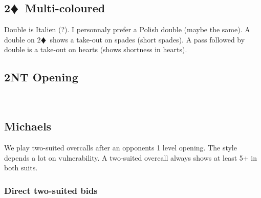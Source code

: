 \documentclass[a4paper]{article}
\newcommand{\BD}{\textcolor{RedOrange}{$\vardiamondsuit$}}
\newcommand{\pdfd}{\texorpdfstring{\BD{}}{D}}
\begin{document}
\subsection{2\pdfd\ Multi-coloured}

Double is Italien (?).
\bigbreak
I personnaly prefer a Polish double (maybe the same). A double on 2\BD\ shows a
take-out on spades (short spades). A pass followed by double is a take-out on
hearts (shows shortness in hearts).
\bigbreak
\subsection{2NT Opening}

\
\bigbreak
\subsection{Michaels}

We play two-suited overcalls after an opponents 1 level opening. The style
depends a lot on vulnerability. A two-suited overcall always shows at least 5+
in both suits.
\bigbreak
\subsubsection{Direct two-suited bids}
\end{document}
